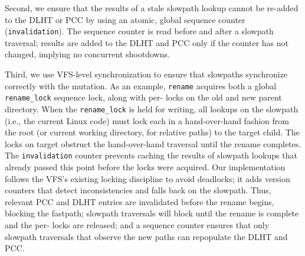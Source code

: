 Second, we ensure that the results of a  stale slowpath lookup cannot be re-added to the DLHT or PCC by using an atomic, global sequence counter ({\tt invalidation}).
The sequence counter is read before and after a slowpath traversal; results are added to the DLHT and PCC only 
if the counter has not changed, implying no concurrent shootdowns.

Third, we use VFS-level synchronization to ensure that slowpaths synchronize correctly 
with the mutation. 
As an example, {\tt rename}
acquires both
a global {\tt rename\_lock} sequence lock, along with per-\dentry{}
locks on the old and new parent directory.
When the {\tt rename\_lock} is held for writing, all lookups on the slowpath 
(i.e., the current Linux code)
must lock each \dentry{}
in a hand-over-hand fashion from the root (or current working directory, for relative paths) 
to the target child.
The locks on target \dentries{} obstruct the hand-over-hand traversal until the rename completes.
The {\tt invalidation} counter prevents caching the results of slowpath lookups that already passed 
this point before the \dentry{} locks were acquired.
Our implementation follows the VFS's existing locking discipline to avoid deadlocks;
it adds version counters that detect inconsistencies and falls back on the slowpath.
Thus, 
relevant PCC and DLHT entries are invalidated before the rename begins, blocking the fastpath;
slowpath traversals will block until the rename is complete
and the per-\dentry{} locks are released;
and a sequence counter ensures that only slowpath traversals that observe the new paths can repopulate the DLHT and PCC.





